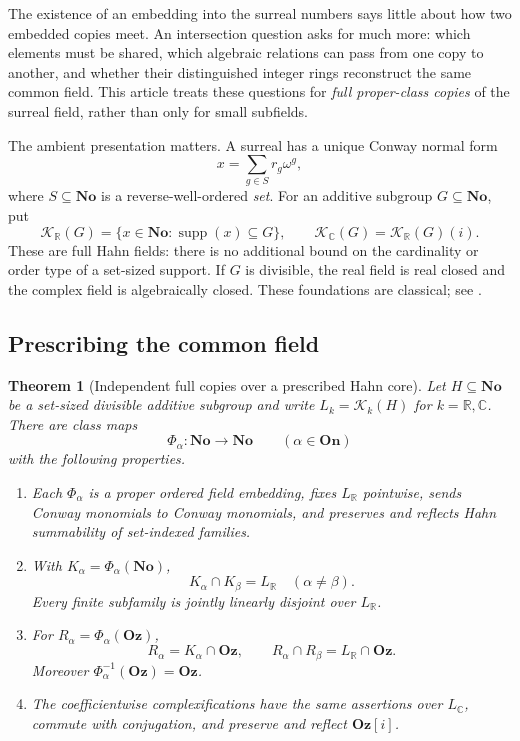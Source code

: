 \documentclass[11pt,letterpaper]{article}
\newtheorem{mainthm}{Theorem}
\theoremstyle{definition}
\theoremstyle{remark}
\newcommand{\No}{\mathbf{No}}
\newcommand{\Oz}{\mathbf{Oz}}
\newcommand{\On}{\mathbf{On}}
\newcommand{\GOz}{\Oz[i]}
\newcommand{\R}{\mathbb R}
\newcommand{\C}{\mathbb C}
\newcommand{\K}[2]{\mathcal K_{#1}(#2)}
\newcommand{\supp}{\operatorname{supp}}
\numberwithin{equation}{section}
\begin{document}
The existence of an embedding into the surreal numbers says little about
how two embedded copies meet. An intersection question asks for much more:
which elements must be shared, which algebraic relations can pass from one
copy to another, and whether their distinguished integer rings reconstruct
the same common field. This article treats these questions for \emph{full
proper-class copies} of the surreal field, rather than only for small
subfields.

The ambient presentation matters. A surreal has a unique Conway normal form
\[
 x=\sum_{g\in S}r_g\omega^g,
\]
where $S\subseteq\No$ is a reverse-well-ordered \emph{set}. For an additive
subgroup $G\subseteq\No$, put
\[
 \K{\R}{G}=\{x\in\No:\supp(x)\subseteq G\},\qquad
 \K{\C}{G}=\K{\R}{G}(i).
\]
These are full Hahn fields: there is no additional bound on the cardinality
or order type of a set-sized support. If $G$ is divisible, the real field is
real closed and the complex field is algebraically closed. These foundations
are classical; see \cite{Gonshor,vdDE,LM}.

\subsection{Prescribing the common field}

\begin{mainthm}[Independent full copies over a prescribed Hahn core]\label{isc:main:copies}
Let $H\subseteq\No$ be a set-sized divisible additive subgroup and write
$L_k=\K{k}{H}$ for $k=\R,\C$. There are class maps
\[
 \Phi_\alpha:\No\longrightarrow\No\qquad(\alpha\in\On)
\]
with the following properties.
\begin{enumerate}[label=\textup{(\roman*)}]
\item Each $\Phi_\alpha$ is a proper ordered field embedding, fixes $L_\R$
pointwise, sends Conway monomials to Conway monomials, and preserves and
reflects Hahn summability of set-indexed families.
\item With $K_\alpha=\Phi_\alpha(\No)$,
\[
 K_\alpha\cap K_\beta=L_\R\quad(\alpha\ne\beta).
\]
Every finite subfamily is jointly linearly disjoint over $L_\R$.
\item For $R_\alpha=\Phi_\alpha(\Oz)$,
\[
 R_\alpha=K_\alpha\cap\Oz,
 \qquad R_\alpha\cap R_\beta=L_\R\cap\Oz.
\]
Moreover $\Phi_\alpha^{-1}(\Oz)=\Oz$.
\item The coefficientwise complexifications have the same assertions over
$L_\C$, commute with conjugation, and preserve and reflect $\GOz$.
\end{enumerate}
\end{mainthm}
\end{document}

